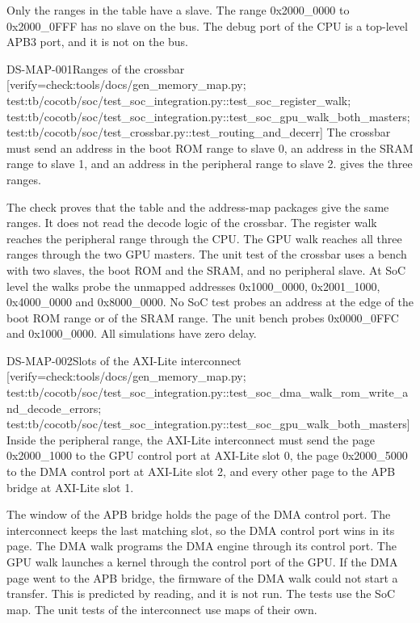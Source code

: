 

Only the ranges in the table have a slave. The range 0x2000\_0000 to 0x2000\_0FFF has no slave on the bus. The debug port of the CPU is a top-level APB3 port, and it is not on the bus.

\begin{requirement}{DS-MAP-001}{Ranges of the crossbar}
[verify={check:tools/docs/gen_memory_map.py; test:tb/cocotb/soc/test_soc_integration.py::test_soc_register_walk; test:tb/cocotb/soc/test_soc_integration.py::test_soc_gpu_walk_both_masters; test:tb/cocotb/soc/test_crossbar.py::test_routing_and_decerr}]
The crossbar must send an address in the boot ROM range to slave 0, an address in the SRAM range to slave 1, and an address in the peripheral range to slave 2.  gives the three ranges.
\end{requirement}
\begin{information}
The check proves that the table and the address-map packages give the same ranges. It does not read the decode logic of the crossbar. The register walk reaches the peripheral range through the CPU. The GPU walk reaches all three ranges through the two GPU masters. The unit test of the crossbar uses a bench with two slaves, the boot ROM and the SRAM, and no peripheral slave. At SoC level the walks probe the unmapped addresses 0x1000\_0000, 0x2001\_1000, 0x4000\_0000 and 0x8000\_0000. No SoC test probes an address at the edge of the boot ROM range or of the SRAM range. The unit bench probes 0x0000\_0FFC and 0x1000\_0000. All simulations have zero delay.
\end{information}

\begin{requirement}{DS-MAP-002}{Slots of the AXI-Lite interconnect}
[verify={check:tools/docs/gen_memory_map.py; test:tb/cocotb/soc/test_soc_integration.py::test_soc_dma_walk_rom_write_and_decode_errors; test:tb/cocotb/soc/test_soc_integration.py::test_soc_gpu_walk_both_masters}]
Inside the peripheral range, the AXI-Lite interconnect must send the page 0x2000\_1000 to the GPU control port at AXI-Lite slot 0, the page 0x2000\_5000 to the DMA control port at AXI-Lite slot 2, and every other page to the APB bridge at AXI-Lite slot 1.
\end{requirement}
\begin{information}
The window of the APB bridge holds the page of the DMA control port. The interconnect keeps the last matching slot, so the DMA control port wins in its page. The DMA walk programs the DMA engine through its control port. The GPU walk launches a kernel through the control port of the GPU. If the DMA page went to the APB bridge, the firmware of the DMA walk could not start a transfer. This is predicted by reading, and it is not run. The tests use the SoC map. The unit tests of the interconnect use maps of their own.
\end{information}

